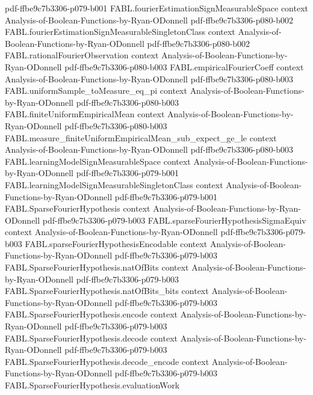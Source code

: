 \begin{theorem}
  {pdf-ffbe9c7b3306-p079-b001}
\proofstep
  {FABL.fourierEstimationSignMeasurableSpace}
  {context}
  {Analysis-of-Boolean-Functions-by-Ryan-ODonnell}
  {pdf-ffbe9c7b3306-p080-b002}
\proofstep
  {FABL.fourierEstimationSignMeasurableSingletonClass}
  {context}
  {Analysis-of-Boolean-Functions-by-Ryan-ODonnell}
  {pdf-ffbe9c7b3306-p080-b002}
\proofstep
  {FABL.rationalFourierObservation}
  {context}
  {Analysis-of-Boolean-Functions-by-Ryan-ODonnell}
  {pdf-ffbe9c7b3306-p080-b003}
\proofstep
  {FABL.empiricalFourierCoeff}
  {context}
  {Analysis-of-Boolean-Functions-by-Ryan-ODonnell}
  {pdf-ffbe9c7b3306-p080-b003}
\proofstep
  {FABL.uniformSample_toMeasure_eq_pi}
  {context}
  {Analysis-of-Boolean-Functions-by-Ryan-ODonnell}
  {pdf-ffbe9c7b3306-p080-b003}
\proofstep
  {FABL.finiteUniformEmpiricalMean}
  {context}
  {Analysis-of-Boolean-Functions-by-Ryan-ODonnell}
  {pdf-ffbe9c7b3306-p080-b003}
\proofstep
  {FABL.measure_finiteUniformEmpiricalMean_sub_expect_ge_le}
  {context}
  {Analysis-of-Boolean-Functions-by-Ryan-ODonnell}
  {pdf-ffbe9c7b3306-p080-b003}
\proofstep
  {FABL.learningModelSignMeasurableSpace}
  {context}
  {Analysis-of-Boolean-Functions-by-Ryan-ODonnell}
  {pdf-ffbe9c7b3306-p079-b001}
\proofstep
  {FABL.learningModelSignMeasurableSingletonClass}
  {context}
  {Analysis-of-Boolean-Functions-by-Ryan-ODonnell}
  {pdf-ffbe9c7b3306-p079-b001}
\proofstep
  {FABL.SparseFourierHypothesis}
  {context}
  {Analysis-of-Boolean-Functions-by-Ryan-ODonnell}
  {pdf-ffbe9c7b3306-p079-b003}
\proofstep
  {FABL.sparseFourierHypothesisSigmaEquiv}
  {context}
  {Analysis-of-Boolean-Functions-by-Ryan-ODonnell}
  {pdf-ffbe9c7b3306-p079-b003}
\proofstep
  {FABL.sparseFourierHypothesisEncodable}
  {context}
  {Analysis-of-Boolean-Functions-by-Ryan-ODonnell}
  {pdf-ffbe9c7b3306-p079-b003}
\proofstep
  {FABL.SparseFourierHypothesis.natOfBits}
  {context}
  {Analysis-of-Boolean-Functions-by-Ryan-ODonnell}
  {pdf-ffbe9c7b3306-p079-b003}
\proofstep
  {FABL.SparseFourierHypothesis.natOfBits_bits}
  {context}
  {Analysis-of-Boolean-Functions-by-Ryan-ODonnell}
  {pdf-ffbe9c7b3306-p079-b003}
\proofstep
  {FABL.SparseFourierHypothesis.encode}
  {context}
  {Analysis-of-Boolean-Functions-by-Ryan-ODonnell}
  {pdf-ffbe9c7b3306-p079-b003}
\proofstep
  {FABL.SparseFourierHypothesis.decode}
  {context}
  {Analysis-of-Boolean-Functions-by-Ryan-ODonnell}
  {pdf-ffbe9c7b3306-p079-b003}
\proofstep
  {FABL.SparseFourierHypothesis.decode_encode}
  {context}
  {Analysis-of-Boolean-Functions-by-Ryan-ODonnell}
  {pdf-ffbe9c7b3306-p079-b003}
\proofstep
  {FABL.SparseFourierHypothesis.evaluationWork}

\end{theorem}
